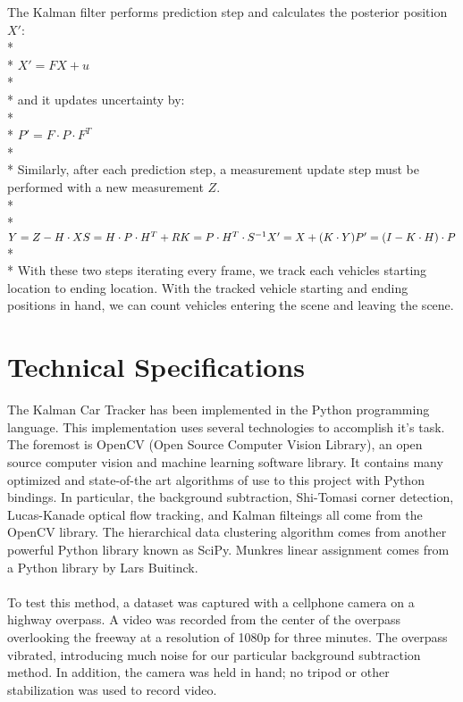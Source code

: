 \documentclass{article} %
\begin{document}
The Kalman filter performs prediction step and calculates the posterior position $X'$:\\*\\* 
$X' = FX+u$\\*\\*
and it updates uncertainty by:\\*\\*
$P' = F \cdot P \cdot F^T$\\*\\*
Similarly, after each prediction step, a measurement update step must be performed with a new measurement $Z$.\\*\\*
$Y = Z - H \cdot X\\*
 S = H \cdot P \cdot H^T + R\\*
 K = P \cdot H^T \cdot S^{-1} \\*
 X' = X + (K\cdot Y)\\*
 P' = (I - K \cdot H) \cdot P $\\*\\*
 With these two steps iterating every frame, we track each vehicles starting location to ending location. With the tracked vehicle starting and ending positions in hand, we can count vehicles entering the scene and leaving the scene.
\section{Technical Specifications}
\label{headings}

The Kalman Car Tracker has been implemented in the Python programming language. This implementation uses several technologies to accomplish it's task. The foremost is OpenCV (Open Source Computer Vision Library), an open source computer vision and machine learning software library. It contains many optimized and state-of-the art algorithms of use to this project with Python bindings. In particular, the background subtraction, Shi-Tomasi corner detection, Lucas-Kanade optical flow tracking, and Kalman filteings all come from the OpenCV library. The hierarchical data clustering algorithm comes from another powerful Python library known as SciPy. Munkres linear assignment comes from a Python library by Lars Buitinck.
\paragraph{}To test this method, a dataset was captured with a cellphone camera on a highway overpass. A video was recorded from the center of the overpass overlooking the freeway at a resolution of 1080p for three minutes. The overpass vibrated, introducing much noise for our particular background subtraction method. In addition, the camera was held in hand; no tripod or other stabilization was used to record video.
\end{document}
